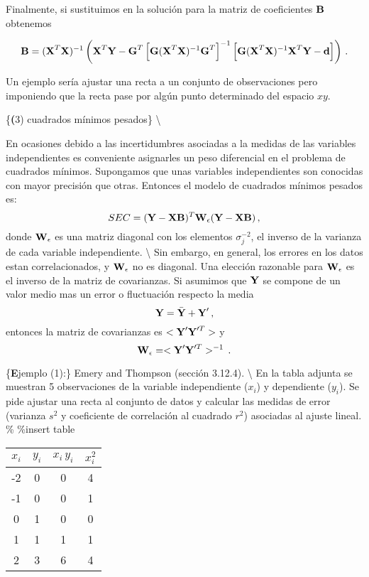 \documentclass[
]{agujournal2019}
\begin{document}
\noindent Finalmente, si sustituimos en la solución para la matriz de
coeficientes \({\textbf B}\) obtenemos

\[{\textbf B}=({\textbf X}^T {\textbf X})^{-1}\left( {\textbf X}^T {\textbf Y} - 
{\textbf G}^T\left[{\textbf G}({\textbf X}^T{\textbf X})^{-1}{\textbf G}^T 
\right]^{-1}\left[{\textbf G}({\textbf X}^T{\textbf X})^{-1}{\textbf X}^T 
{\textbf Y}-{\textbf d}\right] \right)\,.\]

\noindent Un ejemplo sería ajustar una recta a un conjunto de
observaciones pero imponiendo que la recta pase por algún punto
determinado del espacio \(xy\).

\vspace{0.5cm}

\{\noindent \textbf (3) cuadrados mínimos pesados\} \textbackslash{}

\noindent En ocasiones debido a las incertidumbres asociadas a la
medidas de las variables independientes es conveniente asignarles un
peso diferencial en el problema de cuadrados mínimos. Supongamos que
unas variables independientes son conocidas con mayor precisión que
otras. Entonces el modelo de cuadrados mínimos pesados es:
\[SEC=({\textbf Y}-{\textbf X}{\textbf B})^T{\textbf W}_{\epsilon}({\textbf Y}-{\textbf X}{\textbf B})\,,\]
donde \({\textbf W}_{\epsilon}\) es una matriz diagonal con los
elementos \(\sigma_j^{-2}\), el inverso de la varianza de cada variable
independiente. \textbackslash{} \noindent Sin embargo, en general, los
errores en los datos estan correlacionados, y \({\textbf W}_{\epsilon}\)
no es diagonal. Una elección razonable para \({\textbf W}_{\epsilon}\)
es el inverso de la matriz de covarianzas. Si asumimos que
\({\textbf Y}\) se compone de un valor medio mas un error o fluctuación
respecto la media \[{\textbf Y}=\bar{\textbf Y}+{\textbf Y}'\,,\]
entonces la matriz de covarianzas es \(<{\textbf Y}'{\textbf Y}'^T>\) y
\[{\textbf W}_{\epsilon}=<{\textbf Y}'{\textbf Y}'^T>^{-1}\,.\]

\vspace{0.5cm}

\{\noindent \textbf Ejemplo (1):\} Emery and Thompson (sección 3.12.4).
\textbackslash{} \noindent En la tabla adjunta se muestran 5
observaciones de la variable independiente (\(x_i\)) y dependiente
(\(y_i\)). Se pide ajustar una recta al conjunto de datos y calcular las
medidas de error (varianza \(s^2\) y coeficiente de correlación al
cuadrado \(r^2\)) asociadas al ajuste lineal. \% \%insert table

\begin{center}
\begin{tabular}{c c c c}
\hline\hline
$x_i$ & $y_i$ & $x_i\,y_i$ & $x_i^2$ \\ [0.5ex] %
\hline
-2 & 0 & 0 & 4 \\
-1 & 0 & 0 & 1 \\
0 & 1 & 0 & 0 \\
1 & 1 & 1  & 1 \\
2 & 3 & 6 & 4 \\ [1ex] %
\hline
\end{tabular}
\end{center}
\end{document}
